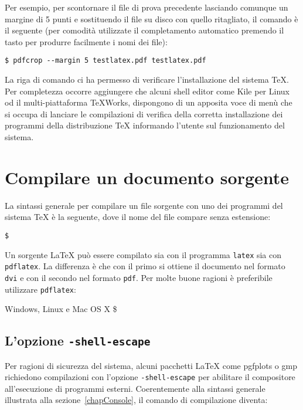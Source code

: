 Per esempio, per scontornare il file di prova precedente lasciando comunque un
margine di 5 punti e sostituendo il file su disco con quello ritagliato, il
comando è il seguente (per comodità utilizzate il completamento automatico
premendo il tasto  per produrre facilmente i nomi dei file):
\begin{verbatim}
$ pdfcrop --margin 5 testlatex.pdf testlatex.pdf
\end{verbatim}


La riga di comando ci ha permesso di verificare l'installazione del sistema
\TeX. Per completezza occorre aggiungere che alcuni shell editor come Kile per
Linux od il multi-piattaforma TeXWorks, dispongono di un apposita voce di menù
che si occupa di lanciare le compilazioni di verifica della corretta
installazione dei programmi della distribuzione \TeX{} informando l'utente sul
funzionamento del sistema.

\section{Compilare un documento sorgente}

La sintassi generale per compilare un file sorgente con uno dei programmi del
sistema \TeX{} è la seguente, dove il nome del file compare senza estensione:

\medskip
\texttt{\$   }
\medskip

Un sorgente \LaTeX{} può essere compilato sia con il programma \texttt{latex}
sia con \texttt{pdflatex}. La differenza è che con il primo si ottiene il
documento nel formato \texttt{dvi} e con il secondo nel formato \texttt{pdf}.
Per molte buone ragioni è preferibile utilizzare \texttt{pdflatex}:
\begin{tcolorbox}
Windows, Linux e Mac OS X
\tcblower
\ttfamily
\$  
\end{tcolorbox}

\subsection{L'opzione \texttt{-shell-escape}}

Per ragioni di sicurezza del sistema, alcuni pacchetti \LaTeX{} come
\textsf{pgfplots} o \textsf{gmp} richiedono compilazioni con l'opzione
\texttt{-shell-escape} per abilitare il compositore all'esecuzione di programmi
esterni. Coerentemente alla sintassi generale illustrata alla
sezione~\ref{chapConsole}, il comando di compilazione diventa:

